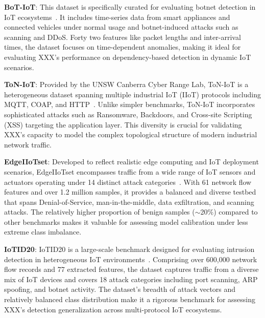 \documentclass[final,twocolumn,10pt]{elsarticle}
\begin{document}
\textbf{BoT-IoT}: This dataset is specifically curated for evaluating botnet detection in IoT ecosystems~\cite{koroniotis2019towards}. It includes time-series data from smart appliances and connected vehicles under normal usage and botnet-induced attacks such as scanning and DDoS. Forty two features like packet lengths and inter-arrival times, the dataset focuses on time-dependent anomalies, making it ideal for evaluating XXX’s performance on dependency-based detection in dynamic IoT scenarios.

\textbf{ToN-IoT}: Provided by the UNSW Canberra Cyber Range Lab, ToN-IoT is a heterogeneous dataset spanning multiple industrial IoT (IIoT) protocols including MQTT, COAP, and HTTP~\cite{fesz-dm97-19}. Unlike simpler benchmarks, ToN-IoT incorporates sophisticated attacks such as Ransomware, Backdoors, and Cross-site Scripting (XSS) targeting the application layer. This diversity is crucial for validating XXX's capacity to model the complex topological structure of modern industrial network traffic.

\textbf{EdgeIIoTset}: Developed to reflect realistic edge computing and IoT deployment scenarios, EdgeIIoTset encompasses traffic from a wide range of IoT sensors and actuators operating under 14 distinct attack categories~\cite{ferrag2022edge}. With 61 network flow features and over 1.2 million samples, it provides a balanced and diverse testbed that spans Denial-of-Service, man-in-the-middle, data exfiltration, and scanning attacks. The relatively higher proportion of benign samples ($\sim$20\%) compared to other benchmarks makes it valuable for assessing model calibration under less extreme class imbalance.

\textbf{IoTID20}: IoTID20 is a large-scale benchmark designed for evaluating intrusion detection in heterogeneous IoT environments~\cite{ullah2020iotid20}. Comprising over 600,000 network flow records and 77 extracted features, the dataset captures traffic from a diverse mix of IoT devices and covers 18 attack categories including port scanning, ARP spoofing, and botnet activity. The dataset's breadth of attack vectors and relatively balanced class distribution make it a rigorous benchmark for assessing XXX's detection generalization across multi-protocol IoT ecosystems.
\end{document}
